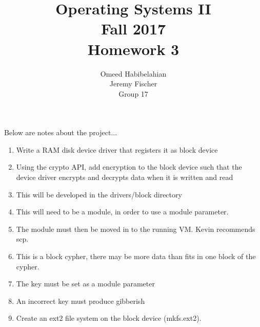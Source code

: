 \documentclass[draftclsnofoot, onecolumn, 10pt, compsoc]{IEEEtran}
\title{\textbf{Operating Systems II}\\Fall 2017\\Homework 3}
\author{Omeed Habibelahian\\Jeremy Fischer\\Group 17}
\begin{document}
	\maketitle
	\newpage
	
	Below are notes about the project...
	\begin{enumerate}
		\item Write a RAM disk device driver that registers it as block device
		\item Using the crypto API, add encryption to the block device such that the device driver encrypts and decrypts data when it is written and read
		\item This will be developed in the drivers/block directory
		\item This will need to be a module, in order to use a module parameter.
		\item The module must then be moved in to the running VM. Kevin recommends scp.
		\item This is a block cypher, there may be more data than fits in one block of the cypher.
		\item The key must be set as a module parameter
		\item An incorrect key must produce gibberish
		\item Create an ext2 file system on the block device (mkfs.ext2).
	\end{enumerate}
	
\end{document}
